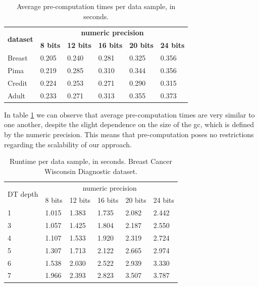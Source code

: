 \begin{table}[H]
\centering
\caption{Average pre-computation times per data sample, in seconds.}
\label{table:avgDTAllDatasets}
\begin{tabular}{|l|l|l|l|l|l|}
\hline
\multicolumn{1}{|c|}{\multirow{2}{*}{\textbf{dataset}}} & \multicolumn{5}{c|}{\textbf{numeric precision}}                                             \\ \cline{2-6} 
\multicolumn{1}{|c|}{}                                  & \textbf{8 bits} & \textbf{12 bits} & \textbf{16 bits} & \textbf{20 bits} & \textbf{24 bits} \\ \hline
Breast                                                  & 0.205           & 0.240            & 0.281            & 0.325            & 0.356            \\ \hline
Pima                                                    & 0.219           & 0.285            & 0.310            & 0.344            & 0.356            \\ \hline
Credit                                                  & 0.224           & 0.253            & 0.271            & 0.290            & 0.315            \\ \hline
Adult                                                   & 0.233           & 0.271            & 0.313            & 0.355            & 0.373            \\ \hline
\end{tabular}
\end{table}


In table \ref{table:avgDTAllDatasets} we can observe that average pre-computation times are very similar to one another, despite the slight dependence on the size of the \ac{gc}, which is defined by the numeric precision. This means that pre-computation poses no restrictions regarding the scalability of our approach.

\begin{table}[H]
\centering
\caption{Runtime per data sample, in seconds. Breast Cancer Wisconsin Diagnostic dataset.}
\label{table:runtimeDTBCW}
\begin{tabular}{|l|l|l|l|l|l|}
\hline
\multirow{2}{*}{DT depth} & \multicolumn{5}{c|}{numeric precision}         \\ \cline{2-6} 
                          & 8 bits & 12 bits & 16 bits & 20 bits & 24 bits \\ \hline
1                         & 1.015  & 1.383   & 1.735   & 2.082   & 2.442   \\ \hline
3                         & 1.057  & 1.425   & 1.804   & 2.187   & 2.550   \\ \hline
4                         & 1.107  & 1.533   & 1.920   & 2.319   & 2.724   \\ \hline
5                         & 1.307  & 1.713   & 2.122   & 2.665   & 2.974   \\ \hline
6                         & 1.538  & 2.030   & 2.522   & 2.939   & 3.330   \\ \hline
7                         & 1.966  & 2.393   & 2.823   & 3.507   & 3.787   \\ \hline
\end{tabular}
\end{table}


